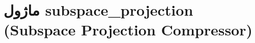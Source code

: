 \section{ماژول subspace\_projection (Subspace Projection Compressor)}
\label{sec:module_subspace_projection}
